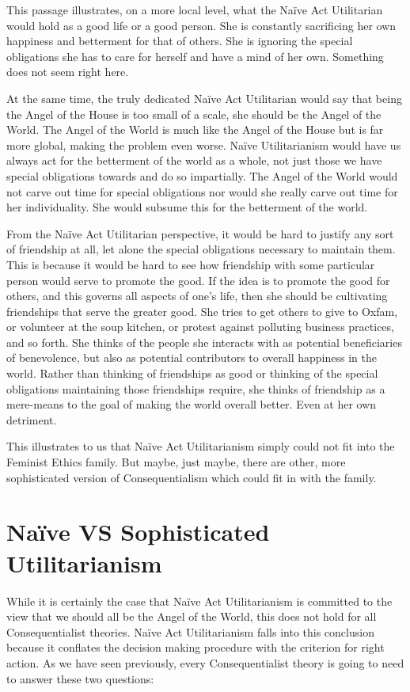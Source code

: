 This passage illustrates, on a more local level, what the Naïve Act Utilitarian would hold as a good life or a good person. She is constantly sacrificing her own happiness and betterment for that of others. She is ignoring the special obligations she has to care for herself and have a mind of her own.  Something does not seem right here. 

At the same time,  the truly dedicated Naïve Act Utilitarian would say that being the Angel of the House is too small of a scale, she should be the Angel of the World. The Angel of the World is much like the Angel of the House but is far more global, making the problem even worse. Naïve Utilitarianism would have us always act for the betterment of the world as a whole, not just those we have special obligations towards and do so impartially. The Angel of the World would not carve out time for special obligations nor would she really carve out time for her individuality. She would subsume this for the betterment of the world.

From the Naïve Act Utilitarian perspective, it would be hard to justify any sort of friendship at all, let alone the special obligations necessary to maintain them. This is because it would be hard to see how friendship with some particular person would serve to promote the good. If the idea is to promote the good for others, and this governs all aspects of one's life, then she should be cultivating friendships that serve the greater good. She tries to get others to give to Oxfam, or volunteer at the soup kitchen, or protest against polluting business practices, and so forth. She thinks of the people she interacts with as potential beneficiaries of benevolence, but also as potential contributors to overall happiness in the world. Rather than thinking of friendships as good or thinking of the special obligations maintaining those friendships require, she thinks of friendship as a mere-means to the goal of making the world overall better. Even at her own detriment.

This illustrates to us that  Naïve Act Utilitarianism simply could not fit into the Feminist Ethics family. But maybe, just maybe, there are other, more sophisticated version of Consequentialism which could fit in with the family. 

\section{Naïve VS Sophisticated Utilitarianism}

While it is certainly the case that  Naïve Act Utilitarianism is committed to the view that we should all be the Angel of the World, this does not hold for all Consequentialist theories.  Naïve Act Utilitarianism falls into this conclusion because it conflates the decision making procedure with the criterion for right action. As we have seen previously, every Consequentialist theory is going to need to answer these two questions: 

